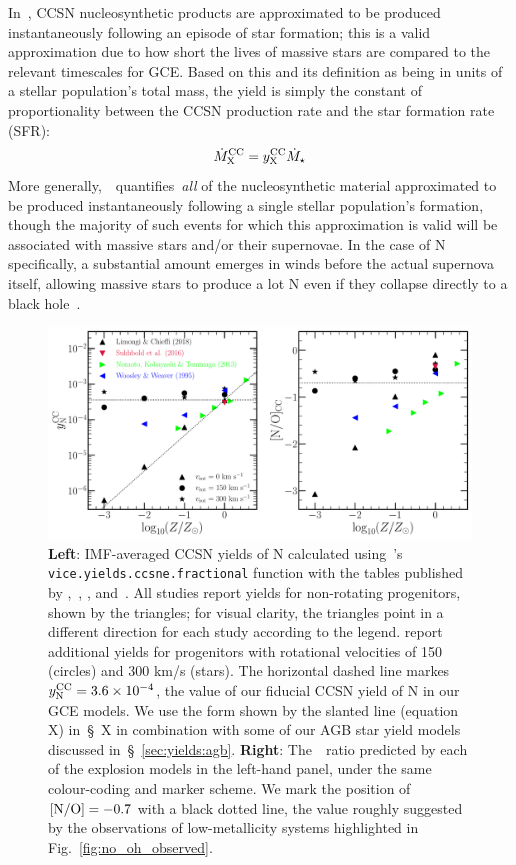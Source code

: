 \documentclass[ms.tex]{subfiles}
\begin{document}
In~\vice, CCSN nucleosynthetic products are approximated to be produced
instantaneously following an episode of star formation; this is a valid
approximation due to how short the lives of massive stars are compared to the
relevant timescales for GCE.
Based on this and its definition as being in units of a stellar population's
total mass, the yield is simply the constant of proportionality between the
CCSN production rate and the star formation rate (SFR):
\begin{equation}
\dot{M}_\text{X}^\text{CC} = y_\text{X}^\text{CC}\dot{M}_\star
\end{equation}
More generally,~~quantifies~\textit{all} of the nucleosynthetic material
approximated to be produced instantaneously following a single stellar
population's formation, though the majority of such events for which this
approximation is valid will be associated with massive stars and/or their
supernovae.
In the case of N specifically, a substantial amount emerges in winds before the
actual supernova itself, allowing massive stars to produce a lot N even if they
collapse directly to a black hole~\citep{Griffith2021a}.

\begin{figure}
\centering
\includegraphics[scale = 0.45]{n_cc_yields.pdf}
\caption{
\textbf{Left}: IMF-averaged CCSN yields of N calculated using~\vice's
\texttt{vice.yields.ccsne.fractional} function with the tables published by
\citet[][blue]{Woosley1995},~\citet[][green]{Nomoto2013},
\citet[][red]{Sukhbold2016}, and~\citet[][black]{Limongi2018}.
All studies report yields for non-rotating progenitors, shown by the triangles;
for visual clarity, the triangles point in a different direction for each study
according to the legend.
\citet{Limongi2018} report additional yields for progenitors with rotational
velocities of 150 (circles) and 300 km/s (stars).
The horizontal dashed line markes~$y_\text{N}^\text{CC} = 3.6\times10^{-4}$,
the value of our fiducial CCSN yield of N in our GCE models.
We use the form shown by the slanted line (equation X) in~\S~X in combination
with some of our AGB star yield models discussed in~\S~\ref{sec:yields:agb}.
\textbf{Right}: The~\no~ratio predicted by each of the explosion models in
the left-hand panel, under the same colour-coding and marker scheme.
We mark the position of~$\text{[N/O]} = -0.7$ with a black dotted line, the value
roughly suggested by the observations of low-metallicity systems highlighted
in Fig.~\ref{fig:no_oh_observed}.
}
\label{fig:n_cc_yields}
\end{figure}
\end{document}
